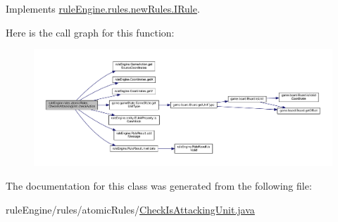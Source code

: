 Implements \mbox{\hyperlink{interfacerule_engine_1_1rules_1_1new_rules_1_1_i_rule_a72ce29a47d7a5fba75a09444a50a481e}{rule\+Engine.\+rules.\+new\+Rules.\+I\+Rule}}.

Here is the call graph for this function\+:
\nopagebreak
\begin{figure}[H]
\begin{center}
\leavevmode
\includegraphics[width=350pt]{classrule_engine_1_1rules_1_1atomic_rules_1_1_check_is_attacking_unit_a38eaf483b961fe287d49aede62f3aae5_cgraph}
\end{center}
\end{figure}


The documentation for this class was generated from the following file\+:\begin{DoxyCompactItemize}
\item 
rule\+Engine/rules/atomic\+Rules/\mbox{\hyperlink{_check_is_attacking_unit_8java}{Check\+Is\+Attacking\+Unit.\+java}}\end{DoxyCompactItemize}
